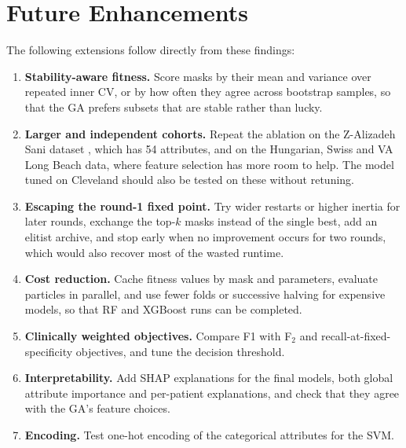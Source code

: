 \documentclass[MTech]{ugthesis}
\begin{document}
\section{Future Enhancements}
The following extensions follow directly from these findings:
\begin{enumerate}
\item \textbf{Stability-aware fitness.} Score masks by their mean and variance over repeated inner CV, or by how often they agree across bootstrap samples, so that the GA prefers subsets that are stable rather than lucky.
\item \textbf{Larger and independent cohorts.} Repeat the ablation on the Z-Alizadeh Sani dataset \citep{alizadehsani2013}, which has 54 attributes, and on the Hungarian, Swiss and VA Long Beach data, where feature selection has more room to help. The model tuned on Cleveland should also be tested on these without retuning.
\item \textbf{Escaping the round-1 fixed point.} Try wider restarts or higher inertia for later rounds, exchange the top-$k$ masks instead of the single best, add an elitist archive, and stop early when no improvement occurs for two rounds, which would also recover most of the wasted runtime.
\item \textbf{Cost reduction.} Cache fitness values by mask and parameters, evaluate particles in parallel, and use fewer folds or successive halving for expensive models, so that RF and XGBoost runs can be completed.
\item \textbf{Clinically weighted objectives.} Compare F1 with F$_2$ and recall-at-fixed-specificity objectives, and tune the decision threshold.
\item \textbf{Interpretability.} Add SHAP explanations \citep{lundberg2017shap} for the final models, both global attribute importance and per-patient explanations, and check that they agree with the GA's feature choices.
\item \textbf{Encoding.} Test one-hot encoding of the categorical attributes for the SVM.
\end{enumerate}

\begin{singlespace}
  
\end{singlespace}
\appendix
\end{document}
